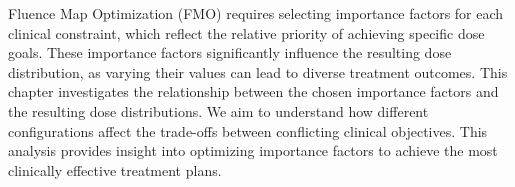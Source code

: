 Fluence Map Optimization (FMO) requires selecting importance factors for each clinical constraint, which reflect the relative priority of achieving specific dose goals.
These importance factors significantly influence the resulting dose distribution, as varying their values can lead to diverse treatment outcomes.
This chapter investigates the relationship between the chosen importance factors and the resulting dose distributions.
We aim to understand how different configurations affect the trade-offs between conflicting clinical objectives.
This analysis provides insight into optimizing importance factors to achieve the most clinically effective treatment plans.